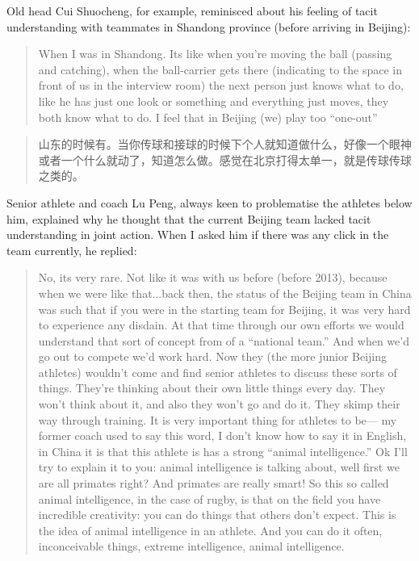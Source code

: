 \begin{CJK}{UTF8}{gbsn}
Old head Cui Shuocheng, for example, reminisced about his feeling of tacit understanding with teammates in Shandong province (before arriving in Beijing):

\begin{quotation}
      When I was in Shandong. Its like when you're moving the ball (passing and catching), when the ball-carrier gets there (indicating to the space in front of us in the interview room) the next person just knows what to do, like he has just one look or something and everything just moves, they both know what to do. I feel that in Beijing (we) play too ``one-out''
\end{quotation}

\begin{quotation}
     	山东的时候有。当你传球和接球的时候下个人就知道做什么，好像一个眼神或者一个什么就动了，知道怎么做。感觉在北京打得太单一，就是传球传球之类的。
\end{quotation}


Senior athlete and coach Lu Peng, always keen to problematise the athletes below him, explained why he thought that the current Beijing team lacked tacit understanding in joint action.  When I asked him if there was any click in the team currently, he replied:

      \begin{quotation}
        No, its very rare.  Not like it was with us before (before 2013), because when we were like that...back then, the status of the Beijing team in China was such that if you were in the starting team for Beijing, it was very hard to experience any disdain.  At that time through our own efforts we would understand that sort of concept from of a ``national team.'' And when we'd go out to compete we'd work hard.  Now they (the more junior Beijing athletes) wouldn't come and find senior athletes to discuss these sorts of things.  They're thinking about their own little things every day.  They won't think about it, and also they won't go and do it.  They skimp their way through training.  It is very important thing for athletes to be--- my former coach used to say this word, I don't know how to say it in English, in China it is that this athlete is has a strong ``animal intelligence.''
        Ok I'll try to explain it to you: animal intelligence is talking about, well first we are all primates right?  And primates are really smart!  So this so called animal intelligence, in the case of rugby, is that on the field you have incredible creativity: you can do things that others don't expect.  This is the idea of animal intelligence in an athlete.  And you can do it often, inconceivable things, extreme intelligence, animal intelligence.
      \end{quotation}


\end{CJK}
